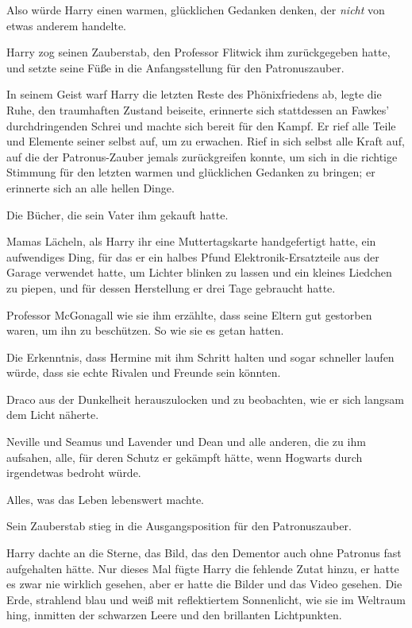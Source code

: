 {Also würde Harry einen warmen, glücklichen Gedanken denken, der \emph{nicht} von etwas anderem handelte.

Harry zog seinen Zauberstab, den Professor Flitwick ihm zurückgegeben hatte, und setzte seine Füße in die Anfangsstellung für den Patronuszauber.

In seinem Geist warf Harry die letzten Reste des Phönixfriedens ab, legte die Ruhe, den traumhaften Zustand beiseite, erinnerte sich stattdessen an Fawkes' durchdringenden Schrei und machte sich bereit für den Kampf. Er rief alle Teile und Elemente seiner selbst auf, um zu erwachen. Rief in sich selbst alle Kraft auf, auf die der Patronus-Zauber jemals zurückgreifen konnte, um sich in die richtige Stimmung für den letzten warmen und glücklichen Gedanken zu bringen; er erinnerte sich an alle hellen Dinge.

Die Bücher, die sein Vater ihm gekauft hatte.

Mamas Lächeln, als Harry ihr eine Muttertagskarte handgefertigt hatte, ein aufwendiges Ding, für das er ein halbes Pfund Elektronik-Ersatzteile aus der Garage verwendet hatte, um Lichter blinken zu lassen und ein kleines Liedchen zu piepen, und für dessen Herstellung er drei Tage gebraucht hatte.

Professor McGonagall wie sie ihm erzählte, dass seine Eltern gut gestorben waren, um ihn zu beschützen. So wie sie es getan hatten.

Die Erkenntnis, dass Hermine mit ihm Schritt halten und sogar schneller laufen würde, dass sie echte Rivalen und Freunde sein könnten.

Draco aus der Dunkelheit herauszulocken und zu beobachten, wie er sich langsam dem Licht näherte.

Neville und Seamus und Lavender und Dean und alle anderen, die zu ihm aufsahen, alle, für deren Schutz er gekämpft hätte, wenn Hogwarts durch irgendetwas bedroht würde.

Alles, was das Leben lebenswert machte.

Sein Zauberstab stieg in die Ausgangsposition für den Patronuszauber.

Harry dachte an die Sterne, das Bild, das den Dementor auch ohne Patronus fast aufgehalten hätte. Nur dieses Mal fügte Harry die fehlende Zutat hinzu, er hatte es zwar nie wirklich gesehen, aber er hatte die Bilder und das Video gesehen. Die Erde, strahlend blau und weiß mit reflektiertem Sonnenlicht, wie sie im Weltraum hing, inmitten der schwarzen Leere und den brillanten Lichtpunkten.

}
